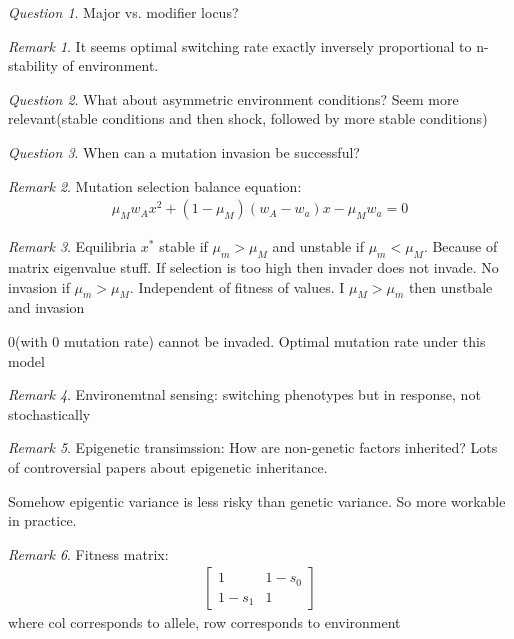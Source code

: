 \documentclass[11pt]{article}
\theoremstyle{remark}
\newtheorem{remark}{Remark}
\newtheorem{quest}{Question}
\begin{document}
\begin{quest}
	Major vs. modifier locus?
\end{quest}

\begin{remark}
	It seems optimal switching rate exactly inversely proportional to n-stability of environment.
\end{remark}

\begin{quest}
	What about asymmetric environment conditions? Seem more relevant(stable conditions and then shock, followed by more stable conditions)
\end{quest}

\begin{quest}
	When can a mutation invasion be successful?
\end{quest}

\begin{remark}
	Mutation selection balance equation:
	\begin{align*}
		\mu_M w_A x^2 + (1-\mu_M)(w_A-w_a)x-\mu_Mw_a = 0
	\end{align*}
\end{remark}

\begin{remark}
	Equilibria $x^*$ stable if $\mu_m > \mu_M$ and unstable if $\mu_m < \mu_M$. Because of matrix eigenvalue stuff. If selection is too high then invader does not invade. No invasion if $\mu_m > \mu_M$. Independent of fitness of values. I $\mu_M > \mu_m$ then unstbale and invasion

	0(with 0 mutation rate) cannot be invaded. Optimal mutation rate under this model
\end{remark}

\begin{remark}
	Environemtnal sensing: switching phenotypes but in response, not stochastically
\end{remark}

\begin{remark}
	Epigenetic transimssion: How are non-genetic factors inherited? Lots of controversial papers about epigenetic inheritance.

	Somehow epigentic variance is less risky than genetic variance. So more workable in practice.
\end{remark}

\begin{remark}
	Fitness matrix:
	\begin{align*}
		\begin{bmatrix}
			1 & 1-s_0 \\
			1-s_1 & 1
		\end{bmatrix}
	\end{align*}
	where col corresponds to allele, row corresponds to environment
\end{remark}
\end{document}
